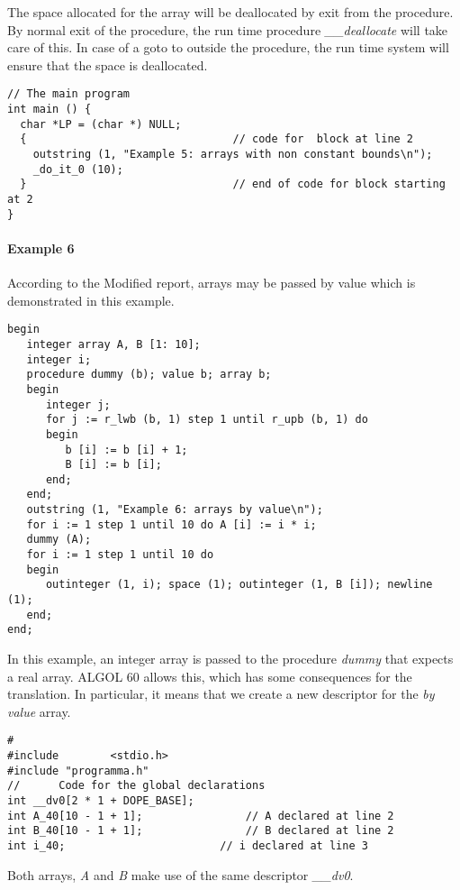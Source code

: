 \documentclass[11pt]{article}
\begin{document}
The space allocated for the array will
be deallocated by exit from the procedure. 
By normal exit of the procedure, the run time procedure
{\em \_\_deallocate} will take care of this.
In case of a goto to outside the procedure, the run time system will ensure
that the space is deallocated. 

{\footnotesize
\begin{verbatim}
// The main program
int main () {
  char *LP = (char *) NULL;
  {                                // code for  block at line 2 
    outstring (1, "Example 5: arrays with non constant bounds\n");
    _do_it_0 (10);
  }                                // end of code for block starting at 2
}
\end{verbatim}
}
\paragraph{Example 6}
According to the Modified report, arrays may be passed by value which
is demonstrated in this example.
{\footnotesize
\begin{verbatim}
begin
   integer array A, B [1: 10];
   integer i;
   procedure dummy (b); value b; array b;
   begin
      integer j;
      for j := r_lwb (b, 1) step 1 until r_upb (b, 1) do
      begin
         b [i] := b [i] + 1;
         B [i] := b [i];
      end;
   end;
   outstring (1, "Example 6: arrays by value\n");
   for i := 1 step 1 until 10 do A [i] := i * i;
   dummy (A);
   for i := 1 step 1 until 10 do
   begin
      outinteger (1, i); space (1); outinteger (1, B [i]); newline (1);
   end;
end;
\end{verbatim}
}
In this example, an integer array is passed to the procedure {\em dummy}
that expects a real array. ALGOL 60 allows this,
which has some consequences for the translation.
In particular, it means that we create a new
descriptor for the {\em by value} array.
{\footnotesize
\begin{verbatim}
#
#include        <stdio.h>
#include "programma.h"
//      Code for the global declarations
int __dv0[2 * 1 + DOPE_BASE];
int A_40[10 - 1 + 1];                // A declared at line 2
int B_40[10 - 1 + 1];                // B declared at line 2
int i_40;                        // i declared at line 3
\end{verbatim}
}
Both arrays, {\em A} and {\em B} make use of the same descriptor {\em \_\_dv0}.
\end{document}

